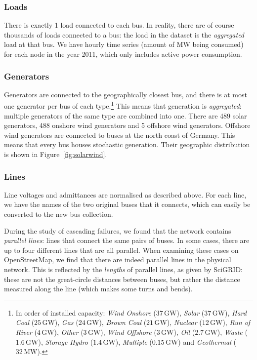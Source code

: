 \documentclass[main.tex]{subfiles}
\begin{document}
\subsubsection{Loads}
There is exactly 1 load connected to each bus. In reality, there are of course thousands of loads connected to a bus: the load in the dataset is the \emph{aggregated} load at that bus. We have hourly time series (\ie amount of $\si{\mega\watt}$ being consumed) for each node in the year 2011, which only includes active power consumption.

\subsubsection{Generators}
Generators are connected to the geographically closest bus, and there is at most one generator per bus of each type.\footnote{In order of installed capacity: \emph{Wind Onshore} ($37\,\si{\giga\watt}$), \emph{Solar} ($37\,\si{\giga\watt}$), \emph{Hard Coal} ($25\,\si{\giga\watt}$), \emph{Gas} ($24\,\si{\giga\watt}$), \emph{Brown Coal} ($21\,\si{\giga\watt}$), \emph{Nuclear} ($12\,\si{\giga\watt}$), \emph{Run of River} ($4\,\si{\giga\watt}$), \emph{Other} ($3\,\si{\giga\watt}$), \emph{Wind Offshore} ($3\,\si{\giga\watt}$), \emph{Oil} ($2.7\,\si{\giga\watt}$), \emph{Waste} ($1.6\,\si{\giga\watt}$), \emph{Storage Hydro} ($1.4\,\si{\giga\watt}$), \emph{Multiple} ($0.15\,\si{\giga\watt}$) and \emph{Geothermal} ($32\,\si{\mega\watt}$).} This means that generation is \emph{aggregated}: multiple generators of the same type are combined into one. There are 489 solar generators, 488 onshore wind generators and 5 offshore wind generators. Offshore wind generators are connected to buses at the north coast of Germany. This means that every bus houses stochastic generation. Their geographic distribution is shown in Figure~\ref{fig:solarwind}.

\subsubsection{Lines}
Line voltages and admittances are normalised as described above. For each line, we have the names of the two original buses that it connects, which can easily be converted to the new bus collection.

During the study of cascading failures, we found that the network contains \emph{parallel lines}: lines that connect the same pairs of buses. In some cases, there are up to four different lines that are all parallel. When examining these cases on OpenStreetMap, we find that there are indeed parallel lines in the physical network. This is reflected by the \emph{lengths} of parallel lines, as given by SciGRID: these are not the great-circle distances between buses, but rather the distance measured along the line (which makes some turns and bends).
\end{document}
